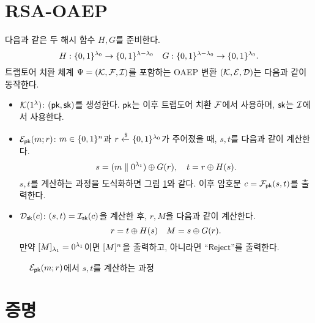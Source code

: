 \documentclass{article}
\theoremstyle{definition}
\begin{document}
\section{RSA-OAEP}
다음과 같은 두 해시 함수 $H, G$를 준비한다.
$$
	\hash: \set{0, 1}^{\sp_0} \to \set{0, 1}^{\sp - \sp_0} \quad
	\gash: \set{0, 1}^{\sp - \sp_0} \to \set{0, 1}^{\sp_0}.
$$
트랩토어 치환 체계 $\tdsch = (\genkey, \td, \itd)$를 포함하는 OAEP 변환
$(\genkey, \enc, \dec)$는 다음과 같이 동작한다.
\begin{itemize}
	\item $\genkey(1^{\sp})$: $(\pk, \sk)$를 생성한다. $\pk$는 이후 트랩도어 치환
	$\td$에서 사용하며, $\sk$는 $\itd$에서 사용한다.
	\item $\enc_{\pk}(\msg; \coin)$: $\msg \in \set{0, 1}^{\mlen}$과 $\coin
	\rgets \set{0, 1}^{\sp_0}$가 주어졌을 때, $s, t$를 다음과 같이 계산한다.
	$$
		s = (\msg \parallel 0^{\sp_1}) \xor \gash(\coin), \quad
		t = \coin \xor \hash(s).
	$$
	$s, t$를 계산하는 과정을 도식화하면 그림 \ref{fig:oaep}와 같다. 이후 암호문
	$\ct = \td_{\pk}(s, t)$를 출력한다.
  	\item $\dec_{\sk}(\ct)$: $(s,t) = \itd_{\sk}(\ct)$을 계산한 후, $r, M$을 다음과
  	같이 계산한다.
	$$
    	r = t \xor \hash(s) \quad M = s \xor \gash(\coin).
	$$
  	만약 $[M]_{\sp_1} = 0^{\sp_1}$이면 $[M]^{\mlen}$을 출력하고, 아니라면
  	“$\textsf{Reject}$”를 출력한다.
\end{itemize}

\begin{figure}[ht]
	\centering
	\caption{$\enc_{\pk}(\msg; \coin)$에서 $s, t$를 계산하는 과정}
	\label{fig:oaep}
\end{figure}

\section{증명}
\end{document}
